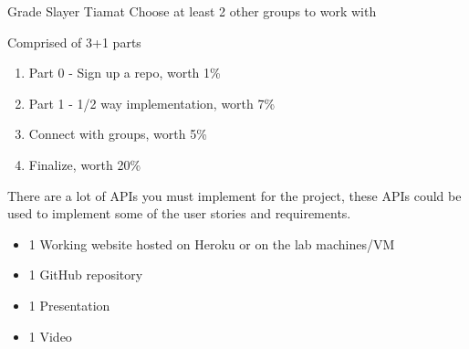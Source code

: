 \documentclass[../CMPUT-404-Notes.tex]{subfiles}
\begin{document}
\begin{monsterbox}{Grade Slayer Tiamat}
    Choose at least 2 other groups to work with
    \begin{monsteraction}
        Comprised of 3+1 parts
        \begin{enumerate}
            \item Part 0 - Sign up a repo, worth 1\%
            \item Part 1 - 1/2 way implementation, worth 7\%
            \item Connect with groups, worth 5\%
            \item Finalize, worth 20\%
        \end{enumerate}
    \end{monsteraction}
    \begin{monsteraction}
        There are a lot of APIs you must implement for the project, these APIs could be used to implement some of the user stories and requirements.
    \end{monsteraction}
    \begin{monsteraction}
        \begin{itemize}
            \item 1 Working website hosted on Heroku or on the lab machines/VM
            \item 1 GitHub repository
            \item 1 Presentation
            \item 1 Video
        \end{itemize}
    \end{monsteraction}
\end{monsterbox}
\end{document}
